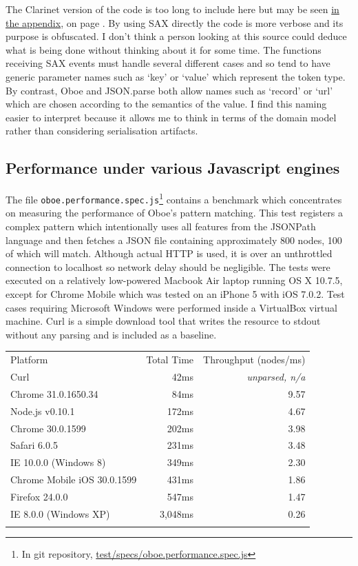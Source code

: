 \documentclass[12pt, ]{article}
\begin{document}
The Clarinet version of the code is too long to include here but may be
seen \hyperref[headerux5fbenchmarkClient]{in the appendix}, on page
\pageref{src_benchmarkClient}. By using SAX directly the code is more
verbose and its purpose is obfuscated. I don't think a person looking at
this source could deduce what is being done without thinking about it
for some time. The functions receiving SAX events must handle several
different cases and so tend to have generic parameter names such as
`key' or `value' which represent the token type. By contrast, Oboe and
JSON.parse both allow names such as `record' or `url' which are chosen
according to the semantics of the value. I find this naming easier to
interpret because it allows me to think in terms of the domain model
rather than considering serialisation artifacts.

\subsection{Performance under various Javascript
engines}\label{performance-under-various-javascript-engines}

The file \texttt{oboe.performance.spec.js}\footnote{In git repository,
  \href{https://github.com/jimhigson/oboe.js/blob/master/test/specs/oboe.performance.spec.js}{test/specs/oboe.performance.spec.js}}
contains a benchmark which concentrates on measuring the performance of
Oboe's pattern matching. This test registers a complex pattern which
intentionally uses all features from the JSONPath language and then
fetches a JSON file containing approximately 800 nodes, 100 of which
will match. Although actual HTTP is used, it is over an unthrottled
connection to localhost so network delay should be negligible. The tests
were executed on a relatively low-powered Macbook Air laptop running OS
X 10.7.5, except for Chrome Mobile which was tested on an iPhone 5 with
iOS 7.0.2. Test cases requiring Microsoft Windows were performed inside
a VirtualBox virtual machine. Curl is a simple download tool that writes
the resource to stdout without any parsing and is included as a
baseline.

\begin{longtable}[c]{@{}lrr@{}}
\hline\noalign{\medskip}
Platform & Total Time & Throughput (nodes/ms)
\\\noalign{\medskip}
\hline\noalign{\medskip}
Curl & 42ms & \emph{unparsed, n/a}
\\\noalign{\medskip}
Chrome 31.0.1650.34 & 84ms & 9.57
\\\noalign{\medskip}
Node.js v0.10.1 & 172ms & 4.67
\\\noalign{\medskip}
Chrome 30.0.1599 & 202ms & 3.98
\\\noalign{\medskip}
Safari 6.0.5 & 231ms & 3.48
\\\noalign{\medskip}
IE 10.0.0 (Windows 8) & 349ms & 2.30
\\\noalign{\medskip}
Chrome Mobile iOS 30.0.1599 & 431ms & 1.86
\\\noalign{\medskip}
Firefox 24.0.0 & 547ms & 1.47
\\\noalign{\medskip}
IE 8.0.0 (Windows XP) & 3,048ms & 0.26
\\\noalign{\medskip}
\hline
\end{longtable}
\end{document}
